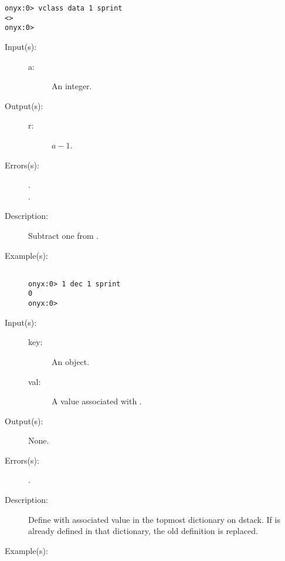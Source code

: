 \begin{description}
\begin{description}
\begin{verbatim}
onyx:0> vclass data 1 sprint
<>
onyx:0>
		\end{verbatim}
	\end{description}
\label{systemdict:dec}
\item[{\onyxop{a}{dec}{r}}: ]
	\begin{description}\item[]
	\item[Input(s): ]
		\begin{description}\item[]
		\item[a: ]
			An integer.
		\end{description}
	\item[Output(s): ]
		\begin{description}\item[]
		\item[r: ]
			$a - 1$.
		\end{description}
	\item[Errors(s): ]
		\begin{description}\item[]
		\item[.]
		\item[.]
		\end{description}
	\item[Description: ]
		Subtract one from .
	\item[Example(s): ]\begin{verbatim}

onyx:0> 1 dec 1 sprint
0
onyx:0>
		\end{verbatim}
	\end{description}
\label{systemdict:def}
\item[{\onyxop{key val}{def}{--}}: ]
	\begin{description}\item[]
	\item[Input(s): ]
		\begin{description}\item[]
		\item[key: ]
			An object.
		\item[val: ]
			A value associated with .
		\end{description}
	\item[Output(s): ] None.
	\item[Errors(s): ]
		\begin{description}\item[]
		\item[.]
		\end{description}
	\item[Description: ]
		Define  with associated value  in the
		topmost dictionary on dstack.  If  is already defined
		in that dictionary, the old definition is replaced.
	\item[Example(s): ]\begin{verbatim}


\end{verbatim}
\end{description}
\end{description}
